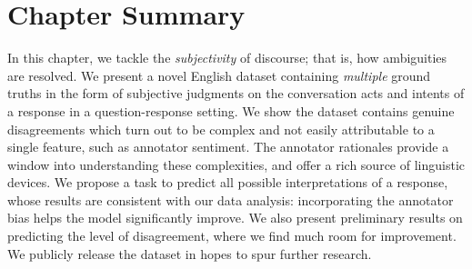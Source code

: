 \section{Chapter Summary}

In this chapter, we tackle the \emph{subjectivity} of discourse; that is, how ambiguities are resolved. We present a novel English dataset containing \emph{multiple} ground truths in the form of subjective judgments on the conversation acts and intents of a response in a question-response setting. We show the dataset contains genuine disagreements which turn out to be complex and not easily attributable to a single feature, such as annotator sentiment. The annotator rationales provide a window into understanding these complexities, and offer a rich source of linguistic devices. We propose a task to predict all possible interpretations of a response, whose results are consistent with our data analysis: incorporating the annotator bias helps the model significantly improve. We also present preliminary results on predicting the level of disagreement, where we find much room for improvement. We publicly release the dataset in hopes to spur further research.
